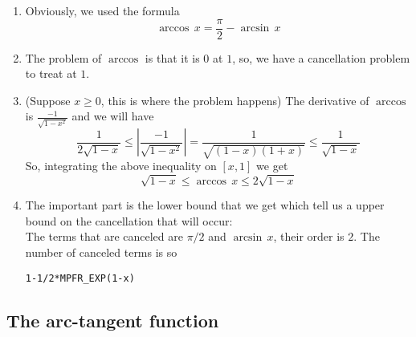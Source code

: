 \documentclass[12pt]{amsart}
\begin{document}
\begin{enumerate}
\item Obviously, we used the formula
\begin{equation*}
\arccos\,x=\frac{\pi}{2}-\arcsin\,x
\end{equation*}
\item The problem of $\arccos$ is that it is $0$ at $1$, so, we have a cancellation problem to treat at $1$.
\item (Suppose $x\geq 0$, this is where the problem happens) The derivative of $\arccos$ is $\frac{-1}{\sqrt{1-x^2}}$ and we will have
\begin{equation*}
\frac{1}{2\sqrt{1-x}}  \leq   |\frac{-1}{\sqrt{1-x^2}}|=\frac{1}{\sqrt{(1-x)(1+x)}}  \leq  \frac{1}{\sqrt{1-x}}
\end{equation*}
So, integrating the above inequality on $[x,1]$ we get
\begin{equation*}
\sqrt{1-x}\leq \arccos\,x\leq 2\sqrt{1-x}
\end{equation*}
\item The important part is the lower bound that we get which tell us a upper bound on the cancellation that will occur:\\
The terms that are canceled are $\pi/2$ and $\arcsin\,x$, their order is $2$. The number of canceled terms is so
\begin{verbatim}
1-1/2*MPFR_EXP(1-x)
\end{verbatim}
\end{enumerate}

\subsection{The arc-tangent function} %

\begin{comment}
Argument reduction $\frac{x}{1+\sqrt{1+x^2}}$:

{Assume} $0 \leq y < 1$, where $y$ is an approximation of some
real $x$ such that $x = y (1 + \delta)$. We approximate
$\frac{x}{1+\sqrt{1+x^2}}$ using the following algorithm:
\begin{quote}
$s \leftarrow \circ(x^2)$ [nearest] \\
$t \leftarrow \circ(1+s)$ [nearest] \\
$u \leftarrow \circ(\sqrt{t})$ [nearest] \\
$v \leftarrow \circ(1+u))$ [nearest] \\
$w \leftarrow \circ(\frac{x}{v})$ [nearest]
\end{quote}
\end{comment}
\end{document}

